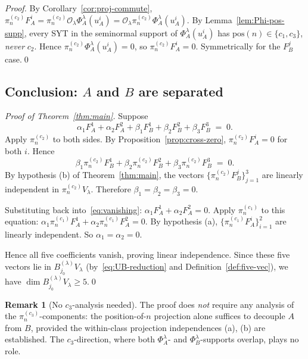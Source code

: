 \documentclass[11pt]{article}
\theoremstyle{definition}
\newtheorem{remark}[theorem]{Remark}
\begin{document}
\begin{proof}
By Corollary~\ref{cor:proj-commute}, $\pi^{(c_2)}_n F_A^i
= \pi^{(c_2)}_n \mathcal{O}_\lambda \Phi_A^\lambda(u_A^i)
= \mathcal{O}_\lambda \pi^{(c_2)}_n \Phi_A^\lambda(u_A^i)$. By
Lemma~\ref{lem:Phi-pos-supp}, every SYT in the seminormal support of
$\Phi_A^\lambda(u_A^i)$ has $\mathrm{pos}(n) \in \{c_1, c_3\}$,
\emph{never} $c_2$. Hence $\pi^{(c_2)}_n \Phi_A^\lambda(u_A^i) = 0$,
so $\pi^{(c_2)}_n F_A^i = 0$. Symmetrically for the
$F_B^j$ case.\qed
\end{proof}

\subsection{Conclusion: $A$ and $B$ are separated}

\begin{proof}[Proof of Theorem~\ref{thm:main}]
Suppose
\begin{equation}\label{eq:vanishing}
   \alpha_1 F_A^1 + \alpha_2 F_A^2 + \beta_1 F_B^1
   + \beta_2 F_B^2 + \beta_3 F_B^3 \;=\; 0.
\end{equation}
Apply $\pi^{(c_2)}_n$ to both sides. By
Proposition~\ref{prop:cross-zero}, $\pi^{(c_2)}_n F_A^i = 0$ for both
$i$. Hence
\[
   \beta_1 \pi^{(c_2)}_n F_B^1
   + \beta_2 \pi^{(c_2)}_n F_B^2
   + \beta_3 \pi^{(c_2)}_n F_B^3 \;=\; 0.
\]
By hypothesis (b) of Theorem~\ref{thm:main}, the vectors
$\{\pi^{(c_2)}_n F_B^j\}_{j=1}^3$ are linearly independent in
$\pi^{(c_2)}_n V_\lambda$. Therefore $\beta_1 = \beta_2 = \beta_3 = 0$.

Substituting back into~\eqref{eq:vanishing}:
$\alpha_1 F_A^1 + \alpha_2 F_A^2 = 0$. Apply $\pi^{(c_1)}_n$ to this
equation: $\alpha_1 \pi^{(c_1)}_n F_A^1 + \alpha_2 \pi^{(c_1)}_n F_A^2 = 0$.
By hypothesis (a), $\{\pi^{(c_1)}_n F_A^i\}_{i=1}^2$ are linearly
independent. So $\alpha_1 = \alpha_2 = 0$.

Hence all five coefficients vanish, proving linear independence.
Since these five vectors lie in $B^{(\lambda)}_{j_0} V_\lambda$
(by~\eqref{eq:UB-reduction} and Definition~\ref{def:five-vec}), we
have $\dim B^{(\lambda)}_{j_0} V_\lambda \ge 5$.\qed
\end{proof}

\begin{remark}[No $c_3$-analysis needed]\label{rem:no-c3}
The proof does \emph{not} require any analysis of the
$\pi^{(c_3)}_n$-components: the position-of-$n$ projection alone
suffices to decouple $A$ from $B$, provided the within-class
projection independences (a), (b) are established. The
$c_3$-direction, where both $\Phi_A^\lambda$- and
$\Phi_B^\lambda$-supports overlap, plays no role.
\end{remark}
\end{document}
